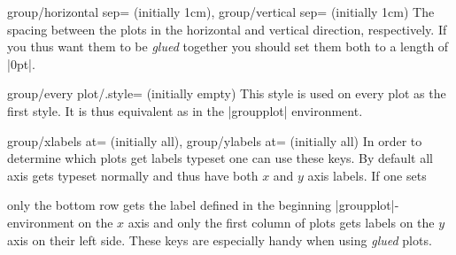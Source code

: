 \begin{pgfplotskeylist}{group/horizontal sep= (initially 1cm),
      group/vertical sep= (initially 1cm)}
  The spacing between the plots in the horizontal and vertical direction, respectively. If you thus want them to be \textit{glued} together you should set
  them both to a length of |0pt|.
\end{pgfplotskeylist}

\begin{pgfplotskey}{group/every plot/.style= (initially empty)}
      This style is used on every plot as the first style. It is thus equivalent as  in the |groupplot| environment.
\end{pgfplotskey}

\begin{pgfplotskeylist}{%
	group/xlabels at= (initially all),%
	group/ylabels at= (initially all)}
  In order to determine which plots get labels typeset one can use these keys. By default all axis gets typeset normally and thus have both $x$ and
  $y$ axis labels. If one sets
\begin{codeexample}[]
\end{codeexample}

only the bottom row gets the label defined in the beginning |groupplot|-environment on the $x$ axis and only the first column of plots gets labels on the
$y$ axis on their left side. These keys are especially handy when using \textit{glued} plots.
\end{pgfplotskeylist}

